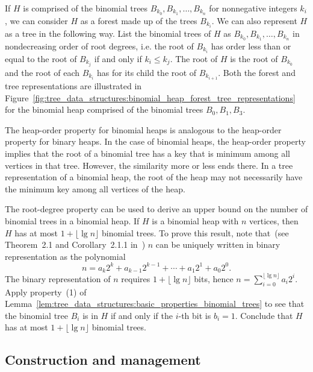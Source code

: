 If $H$ is comprised of the binomial trees
$B_{k_0}, B_{k_1}, \dots, B_{k_n}$ for nonnegative integers $k_i$, we
can consider $H$ as a forest made up of the trees $B_{k_i}$. We can
also represent $H$ as a tree in the following way. List the binomial
trees of $H$ as $B_{k_0}, B_{k_1}, \dots, B_{k_n}$ in nondecreasing
order of root degrees, i.e. the root of $B_{k_i}$ has order less than
or equal to the root of $B_{k_j}$ if and only if $k_i \leq k_j$. The
root of $H$ is the root of $B_{k_0}$ and the root of each $B_{k_i}$
has for its child the root of $B_{k_{i+1}}$. Both the forest and tree
representations are illustrated in
Figure~\ref{fig:tree_data_structures:binomial_heap_forest_tree_representations}
for the binomial heap comprised of the binomial trees
$B_0, B_1, B_3$.

The heap-order property for
binomial heaps is analogous to the heap-order property for binary
heaps. In the case of binomial heaps, the heap-order property implies
that the root of a binomial tree has a key that is minimum among all
vertices in that tree. However, the similarity more or less ends
there. In a tree representation of a binomial heap, the root of the
heap may not necessarily have the minimum key among all vertices of
the heap.

The root-degree property can
be used to derive an upper bound on the number of binomial trees in a
binomial heap. If $H$ is a binomial heap with $n$ vertices, then $H$
has at most $1 + \lfloor \lg n \rfloor$ binomial trees. To prove this
result, note that~(see Theorem~2.1 and Corollary~2.1.1
in~\cite[pp.40--42]{Rosen2000}) $n$ can be uniquely written in binary
representation as the polynomial
\[
n
=
a_k 2^k + a_{k-1} 2^{k-1} + \cdots + a_1 2^1 + a_0 2^0.
\]
The binary representation of $n$ requires $1 + \lfloor \lg n \rfloor$
bits, hence $n = \sum_{i=0}^{\lfloor \lg n \rfloor} a_i 2^i$. Apply
property~(1) of
Lemma~\ref{lem:tree_data_structures:basic_properties_binomial_trees}
to see that the binomial tree $B_i$ is in $H$ if and only if the
$i$-th bit is $b_i = 1$. Conclude that $H$ has at most
$1 + \lfloor \lg n \rfloor$ binomial trees.



\subsection{Construction and management}

